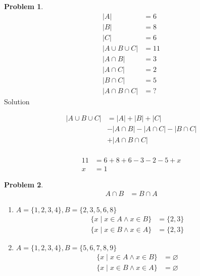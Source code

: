\documentclass{article}
\theoremstyle{definition}
\newtheorem{problem}{Problem}[section]
\begin{document}
\begin{problem}
\[
    \begin{aligned}
        |A| &= 6\\
        |B| &= 8\\
        |C| &= 6\\
        |A \cup B \cup C| &= 11\\
        |A \cap B| &= 3\\
        |A \cap C| &= 2\\
        |B \cap C| &= 5\\
        |A \cap B \cap C| &= ?
    \end{aligned}
\]
Solution

\[
    \begin{aligned}
            |A \cup B \cup C| &= |A| + |B| + |C| \\
            &-|A \cap B| - |A \cap C| - |B \cap C| \\
            &+|A \cap B \cap C| \\
    \end{aligned}
\]

    \[
    \begin{aligned}
            11 &= 6 + 8 + 6 - 3 - 2 - 5 + x\\
            x &= 1
    \end{aligned}
\]


\end{problem}


\begin{problem}
\[

    \begin{aligned}
       A \cap B &= B \cap A
    \end{aligned}
\]
    \begin{enumerate}[label=(\alph*)]
        Validate

        \item  \( A =\{1, 2, 3, 4\}, B = \{2, 3, 5, 6, 8\}\) \\
        \begin{align*}
            \{x \mid x \in A \land x \in B\} &= \{2, 3\} \\
            \{x \mid x \in B \land x \in A\} &= \{2, 3\}
        \end{align*}

        \item \(A = \{1, 2, 3, 4\}, B = \{5, 6, 7, 8, 9\}\)
        \begin{align*}
            \{x \mid x \in A \land x \in B\} &= \varnothing \\
            \{x \mid x \in B \land x \in A\} &= \varnothing
        \end{align*}


    \end{enumerate}
\end{problem}
\end{document}
